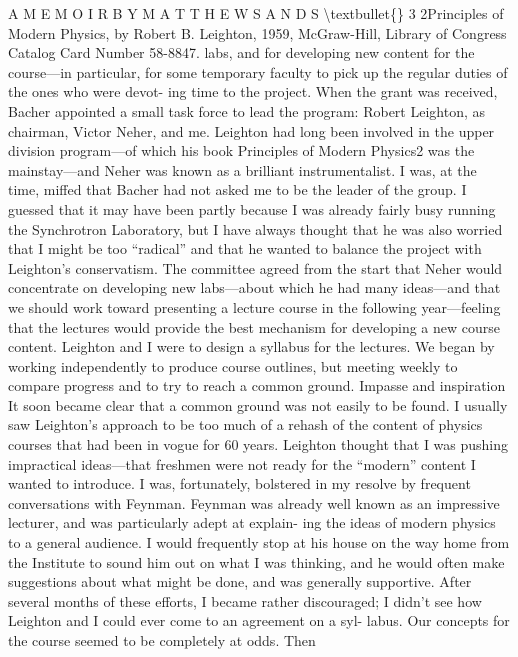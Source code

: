 \documentclass[10pt,oneside]{article}
\begin{document}
A  M E M O I R  B Y  M A T T H E W  S A N D S \textbackslash{}textbullet\{\} 3 2Principles of Modern Physics, by Robert B. Leighton, 1959, McGraw-Hill, Library of Congress Catalog Card Number 58-8847. labs, and for developing new content for the course---in particular, for some temporary faculty to pick up the regular duties of the ones who were devot- ing time to the project. When the grant was received, Bacher appointed a small task force to lead the program: Robert Leighton, as chairman, Victor Neher, and me. Leighton had long been involved in the upper division program---of which his book Principles of Modern Physics2 was the mainstay---and Neher was known as a brilliant instrumentalist. I was, at the time, miffed that Bacher had not asked me to be the leader of the group. I guessed that it may have been partly because I was already fairly busy running the Synchrotron Laboratory, but I have always thought that he was also worried that I might be too “radical” and that he wanted to balance the project with Leighton’s conservatism. The committee agreed from the start that Neher would concentrate on developing new labs---about which he had many ideas---and that we should work toward presenting a lecture course in the following year---feeling that the lectures would provide the best mechanism for developing a new course content. Leighton and I were to design a syllabus for the lectures. We began by working independently to produce course outlines, but meeting weekly to compare progress and to try to reach a common ground. Impasse and inspiration It soon became clear that a common ground was not easily to be found. I usually saw Leighton’s approach to be too much of a rehash of the content of physics courses that had been in vogue for 60 years. Leighton thought that I was pushing impractical ideas---that freshmen were not ready for the “modern” content I wanted to introduce. I was, fortunately, bolstered in my resolve by frequent conversations with Feynman. Feynman was already well known as an impressive lecturer, and was particularly adept at explain- ing the ideas of modern physics to a general audience. I would frequently stop at his house on the way home from the Institute to sound him out on what I was thinking, and he would often make suggestions about what might be done, and was generally supportive. After several months of these efforts, I became rather discouraged; I didn’t see how Leighton and I could ever come to an agreement on a syl- labus. Our concepts for the course seemed to be completely at odds. Then\par
\end{document}

